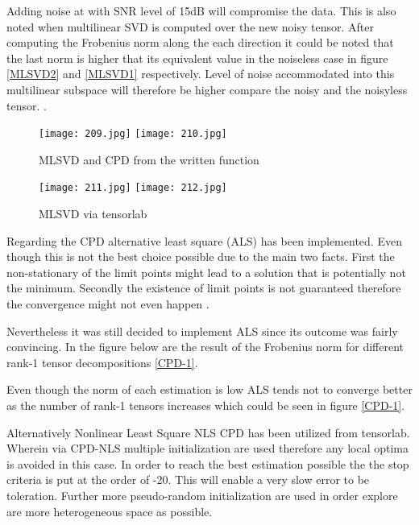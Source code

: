 Adding noise at with SNR level of 15dB will compromise the data. This is also noted when multilinear SVD is computed over the new noisy tensor. After computing the Frobenius norm along the each direction it could be noted that the last norm is higher that its equivalent value in the noiseless case in figure \ref{MLSVD2} and \ref{MLSVD1} respectively. Level of noise accommodated into this multilinear subspace will therefore be higher compare the noisy and the noisyless tensor. .  


\begin{figure}[!htbp]
%
\centering
\texttt{[image: 209.jpg]}
\label{MLSVD}
\endminipage\hfill
{}%
\centering
\texttt{[image: 210.jpg]}
\label{CPD-1}
\endminipage\hfill
\caption{MLSVD and CPD from the written function}\label{ICA_E}
\end{figure}

\begin{figure}[!htbp]
%
\centering
\texttt{[image: 211.jpg]}
\label{MLSVD1}
\endminipage\hfill
{}%
\centering
\texttt{[image: 212.jpg]}
\label{MLSVD2}
\endminipage\hfill
\caption{MLSVD via tensorlab}\label{ICA_E}
\end{figure}


Regarding the CPD alternative least square (ALS) has been implemented. Even though this is not the best choice possible due to the main two facts. First the non-stationary of the limit points might lead to a solution that is potentially not the minimum. Secondly the existence of limit points is not guaranteed therefore the convergence might not even happen \cite{5}.

Nevertheless it was still decided to implement ALS since its outcome was fairly convincing. In the figure below are the result of the Frobenius norm for different rank-1 tensor decompositions \ref{CPD-1}. 

Even though the norm of each estimation is low ALS tends not to converge better as the number of rank-1 tensors increases which could be seen in figure \ref{CPD-1}.

Alternatively Nonlinear Least Square NLS CPD has been utilized from tensorlab. Wherein via CPD-NLS multiple initialization are used therefore any local optima is avoided in this case. In order to reach the best estimation possible the the stop criteria is put at the order of -20. This will enable a very slow error to be toleration. Further more pseudo-random initialization are used in order explore are more heterogeneous space as possible. 

